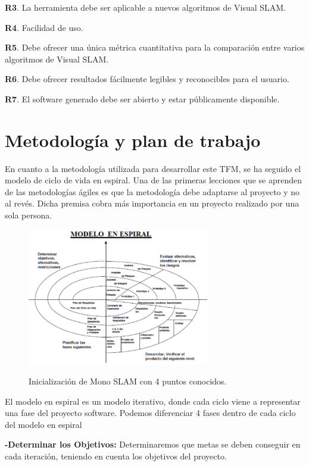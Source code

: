 	\textbf{R3}. La herramienta debe ser aplicable a nuevos algoritmos de Visual SLAM.

	\textbf{R4}. Facilidad de uso.

	\textbf{R5}. Debe ofrecer una única métrica cuantitativa para la comparación entre varios algoritmos de Visual SLAM.

	\textbf{R6}. Debe ofrecer resultados fácilmente legibles y reconocibles para el usuario.

	\textbf{R7}. El software generado debe ser abierto y estar públicamente disponible.

\section{Metodología y plan de trabajo}

En cuanto a la metodología utilizada para desarrollar este TFM, se ha seguido el modelo de ciclo de vida en espiral. Una de las primeras lecciones que se aprenden de las metodologías ágiles es que la metodología debe adaptarse al proyecto y no al revés. Dicha premisa cobra más importancia en un proyecto realizado por una sola persona.

\begin{figure}[H]
\begin{center}
\label{fig:espiral}\includegraphics[height=6.0cm]{img/cap2/modeloEspiral.png}
\end{center}
\caption{Inicialización de Mono SLAM con 4 puntos conocidos.}
\end{figure}


El modelo en espiral es un modelo iterativo, donde cada ciclo viene a representar una fase del proyecto software. Podemos diferenciar 4 fases dentro de cada ciclo del modelo en espiral

\textbf{-Determinar los Objetivos:} Determinaremos que metas se deben conseguir en cada iteración, teniendo en cuenta los objetivos del proyecto.

